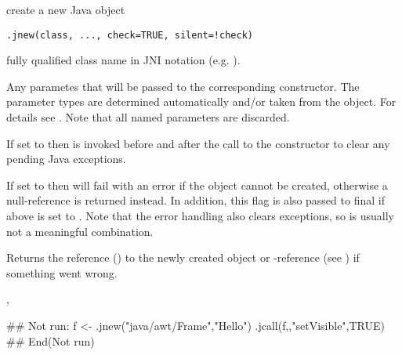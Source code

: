 \begin{Description}\relax
{} create a new Java object
\end{Description}
\begin{Usage}
\begin{verbatim}
.jnew(class, ..., check=TRUE, silent=!check)
\end{verbatim}
\end{Usage}
\begin{Arguments}
\begin{ldescription}
\item[\code{class}] fully qualified class name in JNI notation (e.g. ).
\item[\code{...}] Any parametes that will be passed to the corresponding
constructor. The parameter types are determined automatically and/or
taken from the  object. For details see
. Note that all named parameters are discarded.
\item[\code{check}] If set to  then  is invoked before
and after the call to the constructor to clear any pending Java
exceptions.
\item[\code{silent}] If set to  then  will fail with an error if
the object cannot be created, otherwise a null-reference is returned
instead. In addition, this flag is also passed to final
 if  above is set to . Note
that the error handling also clears exceptions, so
 is usually not a meaningful
combination.

\end{ldescription}
\end{Arguments}
\begin{Value}
Returns the reference () to the newly created object or
-reference (see ) if something went wrong.
\end{Value}
\begin{SeeAlso}\relax
{}, 
\end{SeeAlso}
\begin{Examples}
\begin{ExampleCode}
## Not run: 
f <- .jnew("java/awt/Frame","Hello")
.jcall(f,,"setVisible",TRUE)
## End(Not run)
\end{ExampleCode}
\end{Examples}

